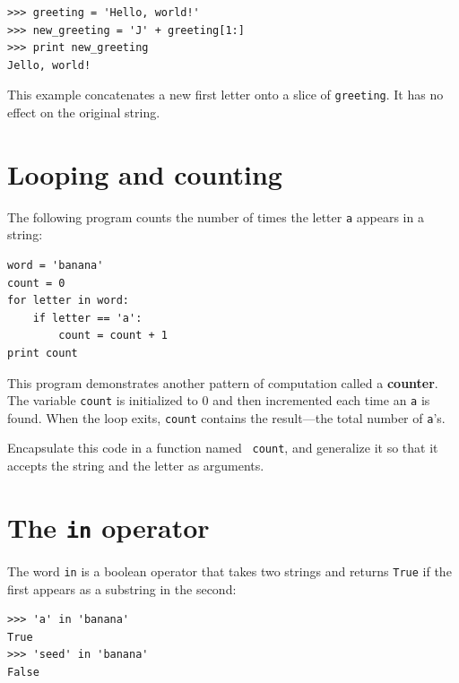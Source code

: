 \documentclass[10pt]{book}
\begin{document}
\beforeverb
\begin{verbatim}
>>> greeting = 'Hello, world!'
>>> new_greeting = 'J' + greeting[1:]
>>> print new_greeting
Jello, world!
\end{verbatim}
\afterverb
%
This example concatenates a new first letter onto
a slice of {\tt greeting}.  It has no effect on
the original string.


\section{Looping and counting}
\label{counter}


The following program counts the number of times the letter {\tt a}
appears in a string:

\beforeverb
\begin{verbatim}
word = 'banana'
count = 0
for letter in word:
    if letter == 'a':
        count = count + 1
print count
\end{verbatim}
\afterverb
%
This program demonstrates another pattern of computation called a {\bf
counter}.  The variable {\tt count} is initialized to 0 and then
incremented each time an {\tt a} is found.
When the loop exits, {\tt count}
contains the result---the total number of {\tt a}'s.

\begin{ex}

Encapsulate this code in a function named {\tt
count}, and generalize it so that it accepts the string and the
letter as arguments.
\end{ex}

\section{The {\tt in} operator}
\label{inboth}


The word {\tt in} is a boolean operator that takes two strings and
returns {\tt True} if the first appears as a substring in the second:

\beforeverb
\begin{verbatim}
>>> 'a' in 'banana'
True
>>> 'seed' in 'banana'
False
\end{verbatim}
\afterverb
%
\end{document}
